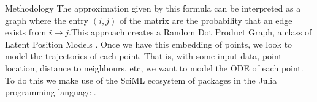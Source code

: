 \documentclass{article}
\begin{document}
\begin{section}{Methodology}
    The approximation  given by this formula can be interpreted as a graph where the entry $(i,j)$ of the matrix are the probability that an edge exists from $i \rightarrow j$.This approach creates a Random Dot Product Graph\cite{athreya2017statistical}, a class of Latent Position Models \cite{hoff2002latent}. Once we have this embedding of points, we look to model the trajectories of each point. That is, with some input data, point location, distance to neighbours, etc, we want to model the ODE of each point. To do this we make use of the SciML ecosystem of packages in the Julia programming language \cite{SciML_C_Rak}.\\



     
    

\end{section}
\end{document}
